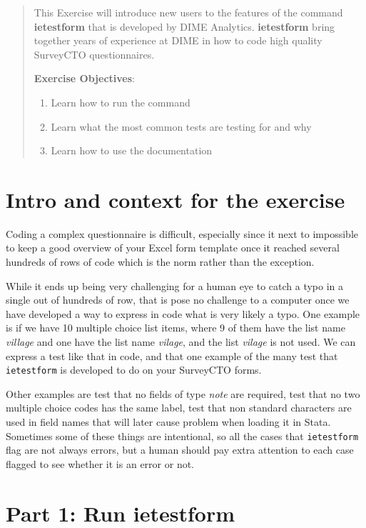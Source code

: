 \documentclass{tufte-handout}
\begin{document}
\begin{abstract}
This Exercise will introduce new users to the features of the command \textbf{ietestform} that is developed by DIME Analytics. \textbf{ietestform} bring together years of experience at DIME in how to code high quality SurveyCTO questionnaires.


\bigskip\noindent \textbf{Exercise Objectives}:
\begin{enumerate}
  \item Learn how to run the command
  \item Learn what the most common tests are testing for and why
  \item Learn how to use the documentation 
\end{enumerate}
\end{abstract}

\section{Intro and context for the exercise}

	Coding a complex questionnaire is difficult, especially since it next to impossible to keep a good overview of your Excel form template once it reached several hundreds of rows of code which is the norm rather than the exception.
	
	While it ends up being very challenging for a human eye to catch a typo in a single out of hundreds of row, that is pose no challenge to a computer once we have developed a way to express in code what is very likely a typo. One example is if we have 10 multiple choice list items, where 9 of them have the list name \textit{village} and one have the list name \textit{vilage}, and the list \textit{vilage} is not used. We can express a test like that in code, and that one example of the many test that \verb|ietestform| is developed to do on your SurveyCTO forms.
	
	Other examples are test that no fields of type \textit{note} are required, test that no two multiple choice codes has the same label, test that non standard characters are used in field names that will later cause problem when loading it in Stata. Sometimes some of these things are intentional, so all the cases that \verb|ietestform| flag are not always errors, but a human should pay extra attention to each case flagged to see whether it is an error or not.

\section{Part 1: Run ietestform}
\end{document}
